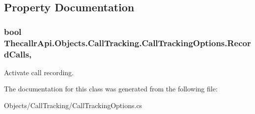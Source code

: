 \subsection{Property Documentation}
\hypertarget{class_thecallr_api_1_1_objects_1_1_call_tracking_1_1_call_tracking_options_a9da9a39ec1dfd7699966699da95c920f}{
\subsubsection[{Record\+Calls}]{\setlength{\rightskip}{0pt plus 5cm}bool Thecallr\+Api.\+Objects.\+Call\+Tracking.\+Call\+Tracking\+Options.\+Record\+Calls\hspace{0.3cm}{\ttfamily [get]}, {\ttfamily [set]}}}\label{class_thecallr_api_1_1_objects_1_1_call_tracking_1_1_call_tracking_options_a9da9a39ec1dfd7699966699da95c920f}


Activate call recording. 



The documentation for this class was generated from the following file\+:\begin{DoxyCompactItemize}
\item 
Objects/\+Call\+Tracking/Call\+Tracking\+Options.\+cs\end{DoxyCompactItemize}
